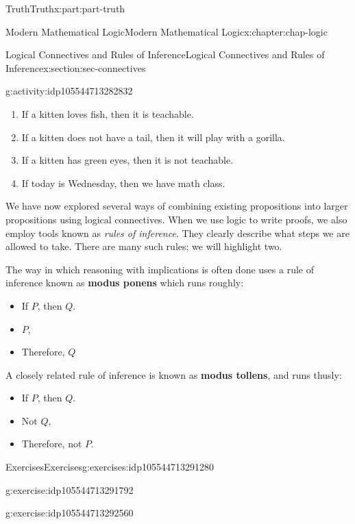 \documentclass[oneside,10pt,]{book}
\newcommand{\terminology}[1]{\textbf{#1}}
\numberwithin{equation}{section}
\begin{document}
\begin{partptx}{Truth}{}{Truth}{}{}{x:part:part-truth}
\begin{chapterptx}{Modern Mathematical Logic}{}{Modern Mathematical Logic}{}{}{x:chapter:chap-logic}
\begin{sectionptx}{Logical Connectives and Rules of Inference}{}{Logical Connectives and Rules of Inference}{}{}{x:section:sec-connectives}
\begin{activity}{}{g:activity:idp105544713282832}
\begin{enumerate}
\item{}If a kitten loves fish, then it is teachable.%
\item{}If a kitten does not have a tail, then it will play with a gorilla.%
\item{}If a kitten has green eyes, then it is not teachable.%
\item{}If today is Wednesday, then we have math class.%
\end{enumerate}
\end{activity}%
We have now explored several ways of combining existing propositions into larger propositions using logical connectives. When we use logic to write proofs, we also employ tools known as \emph{rules of inference}. They clearly describe what steps we are allowed to take. There are many such rules; we will highlight two.%
\par
The way in which reasoning with implications is often done uses a rule of inference known as \terminology{modus ponens} which runs roughly:%
%
\begin{itemize}[label=\textbullet]
\item{}If \(P\), then \(Q\).%
\item{}\(P\),%
\item{}Therefore, \(Q\)%
\end{itemize}
A closely related rule of inference is known as \terminology{modus tollens}, and runs thusly:%
%
\begin{itemize}[label=\textbullet]
\item{}If \(P\), then \(Q\).%
\item{}Not \(Q\),%
\item{}Therefore, not \(P\).%
\end{itemize}
%
%
\typeout{************************************************}
\typeout{************************************************}
%
\begin{exercises-subsection-numberless}{Exercises}{}{Exercises}{}{}{g:exercises:idp105544713291280}
\begin{divisionexercise}{1}{}{}{g:exercise:idp105544713291792}%
%
\end{divisionexercise}%
\begin{divisionexercise}{2}{}{}{g:exercise:idp105544713292560}%
%
\end{divisionexercise}%
\end{exercises-subsection-numberless}
\end{sectionptx}
%
%
\typeout{************************************************}

\end{chapterptx}
\end{partptx}
\end{document}
